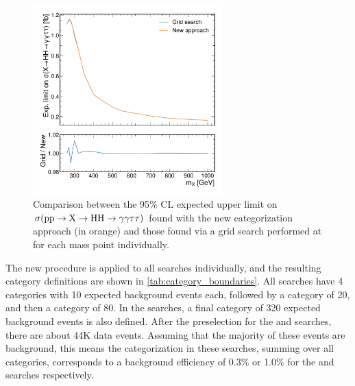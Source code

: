 \begin{figure}
    \centering
    \includegraphics[width=0.65\textwidth]{Figures/Dihiggs/categorisation/grid_search_vs_new.pdf}
    \caption[Performance of a Grid Search of Category Boundaries at Every Mass Point Compared to a New Categorization Approach]{Comparison between the 95\% CL expected upper limit on $\sigma(\mathrm{p}\mathrm{p} \to \mathrm{X} \to \mathrm{H}\mathrm{H} \to \gamma\gamma\tau\tau)$ found with the new categorization approach (in orange) and those found via a grid search performed at for each mass point individually.}\label{fig:grid_search_vs_new}
\end{figure}

The new procedure is applied to all searches individually, and the resulting category definitions are shown in \cref{tab:category_boundaries}. All searches have 4 categories with 10 expected background events each, followed by a category of 20, and then a category of 80. In the \XYH searches, a final category of 320 expected background events is also defined. After the preselection for the \XHH and \XYttHgg searches, there are about 44K data events. Assuming that the majority of these events are background, this means the categorization in these searches, summing over all categories, corresponds to a background efficiency of 0.3\% or 1.0\% for the \XHH and \XYttHgg searches respectively.

